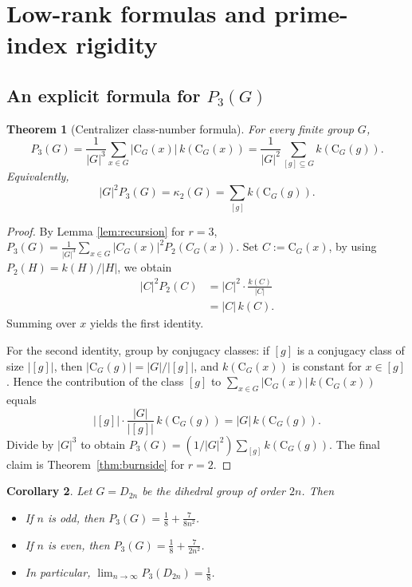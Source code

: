 \documentclass[11pt]{article}
\newtheorem{theorem}{Theorem}[section]
\newtheorem{corollary}[theorem]{Corollary}
\theoremstyle{definition}
\theoremstyle{remark}
\theoremstyle{definition}
\theoremstyle{plain}
\newcommand{\C}{\mathrm{C}}
\begin{document}
\section{Low-rank formulas and prime-index rigidity}

\subsection{An explicit formula for \texorpdfstring{$P_3(G)$}{P3(G)}}
\begin{theorem}[Centralizer class-number formula]\label{thm:P3formula}
For every finite group $G$,
\[
P_3(G)=\frac{1}{|G|^3}\sum_{x\in G}|\C_G(x)|\,k(\C_G(x))
=\frac{1}{|G|^2}\sum_{[g]\subseteq G} k(\C_G(g)).
\]
Equivalently,
\[
|G|^2P_3(G)=\kappa_2(G)=\sum_{[g]}k(\C_G(g)).
\]
\end{theorem}

\begin{proof}
By Lemma \ref{lem:recursion} for $r=3$,  $P_3(G)=\frac{1}{|G|^3}\sum_{x\in G}|C_G(x)|^2 P_2(C_G(x))$.
Set $C:=\C_G(x)$, by using $P_2(H)=k(H)/|H|$, we obtain
\[
\begin{aligned}
|C|^2 P_2(C)
&= |C|^2\cdot \frac{k(C)}{|C|} \\
&= |C|\,k(C).
\end{aligned}
\]
Summing over $x$ yields the first identity.

For the second identity, group by conjugacy classes: if $[g]$ is a conjugacy class of size
$|[g]|$, then $|\C_G(g)|=|G|/|[g]|$, and $k(\C_G(x))$ is constant for $x\in[g]$.
Hence the contribution of the class $[g]$ to $\sum_{x\in G}|\C_G(x)|\,k(\C_G(x))$
equals
\[
|[g]|\cdot \frac{|G|}{|[g]|}\,k(\C_G(g))=|G|\,k(\C_G(g)).
\]
Divide by $|G|^3$ to obtain $P_3(G)=(1/|G|^2)\sum_{[g]}k(\C_G(g))$.
The final claim is Theorem~\ref{thm:burnside} for $r=2$.
\end{proof}

\begin{corollary}\label{dihedral-P3-lim}
Let $G=D_{2n}$ be the dihedral group of order $2n$. Then
\begin{itemize}
\item If $n$ is odd, then $P_3(G)=\frac{1}{8}+\frac{7}{8n^2}$.
\item If $n$ is even, then $P_3(G)=\frac{1}{8}+\frac{7}{2n^2}$.
\item In particular, $\lim_{n\to\infty}P_3(D_{2n})=\frac{1}{8}$.
\end{itemize}
\end{corollary}
\end{document}
